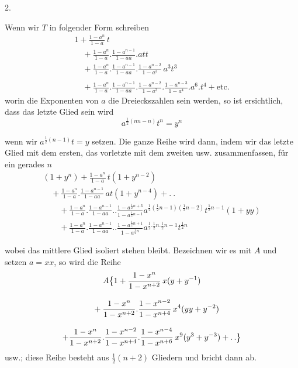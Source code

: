 \begingroup
\renewcommand{\arraystretch}{1.45}

\par\medskip{}\centerline{2.}\nobreak\smallskip
Wenn wir $T$ in folgender Form schreiben
\[
\begin{gathered}
1+\frac{1-a^n}{1-a}\,t
 \\[8pt]\quad{}+\frac{1-a^n}{1-a}.\frac{1-a^{n-1}}{1-aa}.att
 \\[8pt]\quad{}+\frac{1-a^n}{1-a}.\frac{1-a^{n-1}}{1-aa}.
  \frac{1-a^{n-2}}{1-a^3}\,a^3t^3
\\[8pt]
\qquad\\[8pt]\quad{}+\frac{1-a^n}{1-a}.\frac{1-a^{n-1}}{1-aa}.
  \frac{1-a^{n-2}}{1-a^3}.\frac{1-a^{n-3}}{1-a^4}.a^6.t^4
 +\text{etc.}
\end{gathered}
\]
worin die Exponenten von $a$ die Dreieckszahlen sein werden, so ist ersichtlich,
dass das letzte Glied sein wird
\[
a^{\frac12(nn-n)}t^n=y^n
\]

wenn wir $a^{\frac12(n-1)}t=y$ setzen. Die ganze Reihe wird dann,
indem wir das letzte Glied mit dem ersten, das vorletzte mit dem zweiten
usw. zusammenfassen, für ein gerades $n$
\[
\begin{gathered}
(1+y^n)+\frac{1-a^n}{1-a}\,t(1+y^{n-2})
 \\[8pt]\quad{}+\frac{1-a^n}{1-a}.\frac{1-a^{n-1}}{1-aa}\,at(1+y^{n-4})+.\ .
\\[8pt]
\qquad+\frac{1-a^n}{1-a}.\frac{1-a^{n-1}}{1-aa}..\frac{1-a^{\frac12n+3}}{1-a^{\frac12n-1}}
 a^{\frac12(\frac12n-1)(\frac12n-2)}t^{\frac12n-1}(1+yy)
\\[8pt]
\qquad+\frac{1-a^n}{1-a}.\frac{1-a^{n-1}}{1-aa}..\frac{1-a^{\frac12n+1}}{1-a^{\frac12n}}
 a^{\frac12.\frac12n.\frac12n-1}t^{\frac12n}
\end{gathered}
\]

wobei das mittlere Glied isoliert stehen bleibt. Bezeichnen wir es
mit $A$ und setzen $a=xx$, so wird die Reihe
\[
\begin{gathered}
A\bigl\{1+\frac{1-x^n}{1-x^{n+2}}\,x(y+y^{-1})
 \\[8pt]\quad{}+\frac{1-x^n}{1-x^{n+2}}.\frac{1-x^{n-2}}{1-x^{n+4}}\,x^4(yy+y^{-2})
\\[8pt]
+\frac{1-x^n}{1-x^{n+2}}.\frac{1-x^{n-2}}{1-x^{n+4}}.
 \frac{1-x^{n-4}}{1-x^{n+6}}\,x^9(y^3+y^{-3})+\mathinner{.\,.}\bigr\}
\end{gathered}
\]
usw.; diese Reihe besteht aus $\frac12(n+2)$ Gliedern und bricht dann ab.


